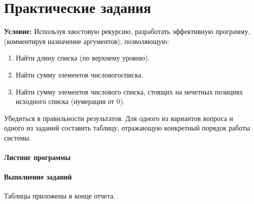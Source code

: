\chapter{Практические задания}

\textbf{Условие:} Используя  хвостовую  рекурсию,  разработать эффективную программу, (комментируя назначение аргументов), позволяющую:

\begin{enumerate}
	\item Найти длину списка (по верхнему уровню).
	\item Найти сумму элементов числовогосписка.
	\item Найти  сумму  элементов  числового списка,  стоящих  на  нечетных  позициях исходного списка (нумерация от $0$).
\end{enumerate}

Убедиться в правильности результатов. Для одного из вариантов вопроса и одного из заданий составить таблицу, отражающую конкретный порядок работы системы.

\subsubsection{Листинг программы}



\subsubsection{Выполнение заданий}

Таблицы приложены в конце отчета.
